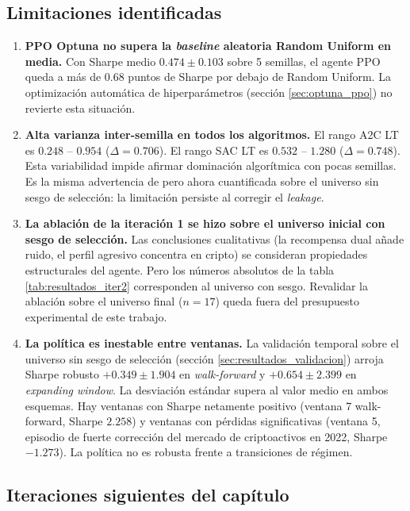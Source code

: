 \documentclass[IB,a4paper]{TFUOC}
\begin{document}
\subsection{Limitaciones identificadas}

\begin{enumerate}
    \item \textbf{PPO Optuna no supera la \textit{baseline} aleatoria Random Uniform en media.} Con Sharpe medio $0.474 \pm 0.103$ sobre 5 semillas, el agente PPO queda a más de 0.68 puntos de Sharpe por debajo de Random Uniform. La optimización automática de hiperparámetros (sección \ref{sec:optuna_ppo}) no revierte esta situación.
    \item \textbf{Alta varianza inter-semilla en todos los algoritmos.} El rango A2C LT es $0.248$ -- $0.954$ ($\Delta = 0.706$). El rango SAC LT es $0.532$ -- $1.280$ ($\Delta = 0.748$). Esta variabilidad impide afirmar dominación algorítmica con pocas semillas. Es la misma advertencia de \citet{henderson2018deeprl} pero ahora cuantificada sobre el universo sin sesgo de selección: la limitación persiste al corregir el \textit{leakage}.
    \item \textbf{La ablación de la iteración 1 se hizo sobre el universo inicial con sesgo de selección.} Las conclusiones cualitativas (la recompensa dual añade ruido, el perfil agresivo concentra en cripto) se consideran propiedades estructurales del agente. Pero los números absolutos de la tabla \ref{tab:resultados_iter2} corresponden al universo con sesgo. Revalidar la ablación sobre el universo final ($n=17$) queda fuera del presupuesto experimental de este trabajo.
    \item \textbf{La política es inestable entre ventanas.} La validación temporal sobre el universo sin sesgo de selección (sección \ref{sec:resultados_validacion}) arroja Sharpe robusto $+0.349 \pm 1.904$ en \textit{walk-forward} y $+0.654 \pm 2.399$ en \textit{expanding window}. La desviación estándar supera al valor medio en ambos esquemas. Hay ventanas con Sharpe netamente positivo (ventana 7 walk-forward, Sharpe $2.258$) y ventanas con pérdidas significativas (ventana 5, episodio de fuerte corrección del mercado de criptoactivos en 2022, Sharpe $-1.273$). La política no es robusta frente a transiciones de régimen.
\end{enumerate}

\subsection{Iteraciones siguientes del capítulo}
\end{document}
